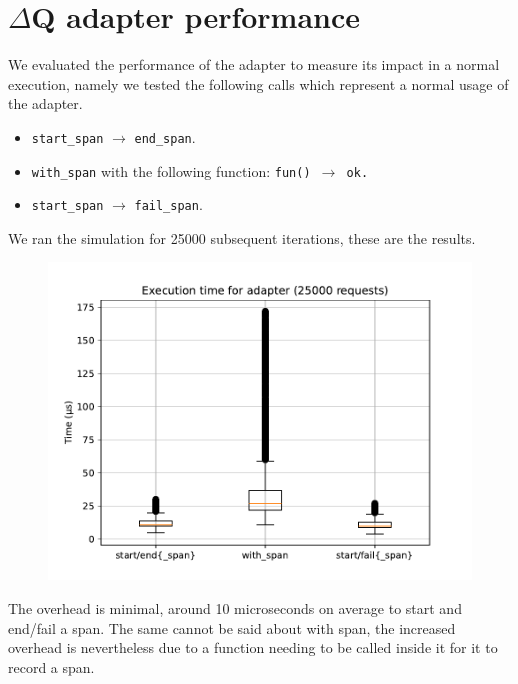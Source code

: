 \section{$\Delta$Q adapter performance}
    We evaluated the performance of the adapter to measure its impact in a normal execution, namely we tested the following calls which represent a normal usage of the adapter.
    \begin{itemize}
        \item \texttt{start\_span} $\rightarrow$ \texttt{end\_span}.
        \item \texttt{with\_span} with the following function: \texttt{fun() $\rightarrow$ ok.}
        \item \texttt{start\_span} $\rightarrow$ \texttt{fail\_span}.
    \end{itemize}

    We ran the simulation for 25000 subsequent iterations, these are the results.
    \begin{figure}[H]
        \begin{center}
            \includegraphics[width=0.8\linewidth]{img/adapter.pdf}
        \end{center}
    \end{figure}

    The overhead is minimal, around 10 microseconds on average to start and end/fail a span. The same cannot be said about with span, the increased overhead is nevertheless due to a function needing to be called inside it for it to record a span. 

